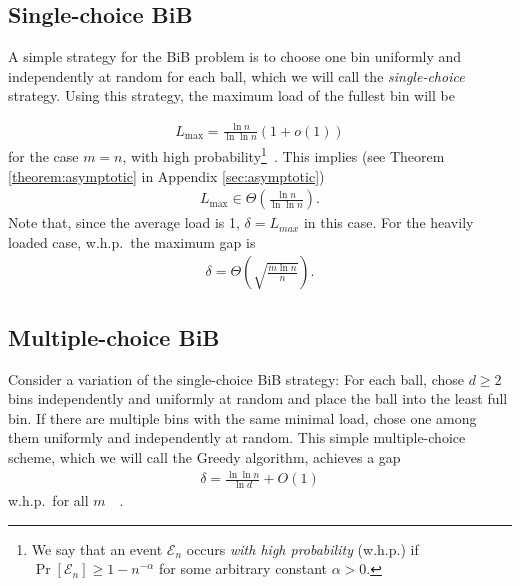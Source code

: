\documentclass[a4paper,12pt]{article}
\newcommand\load{L_{\mathrm{max}}}
\begin{document}
\subsection{Single-choice BiB}
\label{sec:single-choice}
A simple strategy for the BiB problem is to choose one bin uniformly and independently at random for each ball, which we will call the \emph{single-choice} strategy. Using this strategy, the maximum load of the fullest bin will be
\begin{comment}
\footnote{A more accurate result exists: The maximum load is $\load = \Gamma^{-1}\left(n\right)\left(1+O\left(\frac{1}{\log \Gamma^{-1}\left(n\right)}\right)\right)$ \cite{G91}.}
\end{comment}
\begin{align*}
\load = \frac{\ln n}{\ln \ln n}  \left(1 + o\left(1\right)\right)
\end{align*}
for the case $m=n$, with high probability\footnote{We say that an event $\mathcal E_n$ occurs \emph{with high probability} (w.h.p.) if $\Pr\left[\mathcal E_n \right] \geq 1 - n^{-\alpha}$ for some arbitrary constant $\alpha > 0$.}~\cite{RS98}. This implies (see Theorem \ref{theorem:asymptotic} in Appendix \ref{sec:asymptotic})
\begin{align*}
\load\in \Theta\left(\frac{\ln n}{\ln \ln n}\right).
\end{align*}
Note that, since the average load is 1, $\delta = L_{max}$ in this case. For the heavily loaded case, w.h.p.~the maximum gap is ~\cite{RS98}
\begin{align*}
\delta = \Theta\left(\sqrt{\frac{m  \ln n}{n}}\right).
\end{align*}

\subsection{Multiple-choice BiB}
Consider a variation of the  single-choice BiB strategy: For each ball, chose $d \geq 2$ bins independently and uniformly at random and place the ball into the least full bin. If there are multiple bins with the same minimal load, chose one among them uniformly and independently at random. This simple multiple-choice scheme, which we will call the Greedy algorithm, achieves a gap
\begin{align*}
\delta = \frac{\ln \ln n}{\ln d} + O(1)
\end{align*}
 w.h.p.~for all $m$~\cite{ABKU99}~\cite{BCSV06}.
 
\end{document}
